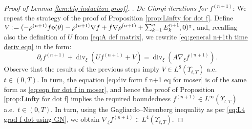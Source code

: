 \documentclass[11pt,a4paper,reqno]{amsart}
\theoremstyle{remark}
\theoremstyle{definition}
\numberwithin{equation}{section}
\DeclareMathOperator{\dv}{div}
\newcommand{\e}{{\bf e}}
\newcommand{\bxi}{\xi}
\begin{document}
\begin{proof}[Proof of Lemma \ref{lem:big induction proof}]
. \textit{De Giorgi iterations for $f^{(n+1)}$}: We repeat the strategy of the proof of Proposition \ref{prop:Linfty for dot f}. Define $V := (
        -\rho^{(n+1)}f \e(\theta) -\rho^{(n+1)}\nabla f + f \nabla \rho^{(n+1)} + \sum_{k=1}^n E^{n+1}_k , 0 )^\intercal$, and, recalling also the definition of $U$ from \eqref{eq:A def matrix}, we rewrite \eqref{eq:general n+1th time deriv eqn} in the form: 
\begin{equation}\label{eq:div form f n+1 eq for moser}
    \partial_t f^{(n+1)} + \dv_{\bxi}(U f^{(n+1)} + V) = \dv_{\bxi}(A \nabla_{\bxi} f^{(n+1)}). 
\end{equation}
Observe that the results of the previous steps imply $V \in L^8(\Upsilon_{t,T})$ a.e.~$t \in (0,T)$. In turn, the equation \eqref{eq:div form f n+1 eq for moser} is of the same form as \eqref{eq:eqn for dot f in moser}, and hence the proof of Proposition \ref{prop:Linfty for dot f} implies the required boundedness 
$f^{(n+1)} \in L^\infty(\Upsilon_{t,T})$ a.e.~$t\in(0,T)$. In turn, using the Gagliardo--Nirenberg inequality as per \eqref{eq:L4 grad f dot using GN}, we obtain $\nabla_{\bxi} f^{(n+1)} \in L^4(\Upsilon_{t,T})$. 

\smallskip 


\end{proof}
\end{document}
